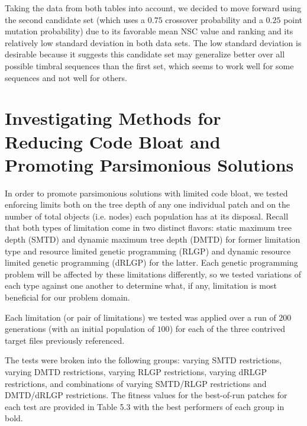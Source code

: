 \documentclass[12pt]{report} 	%
\numberwithin{figure}{chapter}
\numberwithin{table}{chapter}
\numberwithin{equation}{chapter}
\begin{document}
\begin{flushleft}
Taking the data from both tables into account, we decided to move forward using the second candidate set (which uses a $0.75$ crossover probability and a $0.25$ point mutation probability) due to its favorable mean NSC value and ranking and its relatively low standard deviation in both data sets. The low standard deviation is desirable because it suggests this candidate set may generalize better over all possible timbral sequences than the first set, which seems to work well for some sequences and not well for others.

\section{Investigating Methods for Reducing Code Bloat and Promoting Parsimonious Solutions}
In order to promote parsimonious solutions with limited code bloat, we tested enforcing limits both on the tree depth of any one individual patch and on the number of total objects (i.e. nodes) each population has at its disposal. Recall that both types of limitation come in two distinct flavors: static maximum tree depth (SMTD) and dynamic maximum tree depth (DMTD) for former limitation type and resource limited genetic programming (RLGP) and dynamic resource limited genetic programming (dRLGP) for the latter. Each genetic programming problem will be affected by these limitations differently, so we tested variations of each type against one another to determine what, if any, limitation is most beneficial for our problem domain. 

Each limitation (or pair of limitations) we tested was applied over a run of $200$ generations (with an initial population of $100$) for each of the three contrived target files previously referenced.

The tests were broken into the following groups: varying SMTD restrictions, varying DMTD restrictions, varying RLGP restrictions, varying dRLGP restrictions, and combinations of varying SMTD/RLGP restrictions and DMTD/dRLGP restrictions. The fitness values for the best-of-run patches for each test are provided in Table 5.3 with the best performers of each group in bold.


\end{flushleft}
\end{document}
